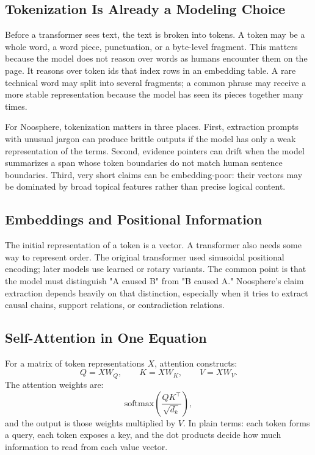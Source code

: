 \documentclass[11pt]{article}
\begin{document}
\subsection{Tokenization Is Already a Modeling Choice}

Before a transformer sees text, the text is broken into tokens. A token may be a
whole word, a word piece, punctuation, or a byte-level fragment. This matters
because the model does not reason over words as humans encounter them on the
page. It reasons over token ids that index rows in an embedding table. A rare
technical word may split into several fragments; a common phrase may receive a
more stable representation because the model has seen its pieces together many
times.

For Noosphere, tokenization matters in three places. First, extraction prompts
with unusual jargon can produce brittle outputs if the model has only a weak
representation of the terms. Second, evidence pointers can drift when the model
summarizes a span whose token boundaries do not match human sentence
boundaries. Third, very short claims can be embedding-poor: their vectors may be
dominated by broad topical features rather than precise logical content.

\subsection{Embeddings and Positional Information}

The initial representation of a token is a vector. A transformer also needs some
way to represent order. The original transformer used sinusoidal positional
encoding; later models use learned or rotary variants. The common point is that
the model must distinguish "A caused B" from "B caused A." Noosphere's claim
extraction depends heavily on that distinction, especially when it tries to
extract causal chains, support relations, or contradiction relations.

\subsection{Self-Attention in One Equation}

For a matrix of token representations $X$, attention constructs:
\[
Q = XW_Q,\qquad K = XW_K,\qquad V = XW_V.
\]
The attention weights are:
\[
\mathrm{softmax}\left(\frac{QK^\top}{\sqrt{d_k}}\right),
\]
and the output is those weights multiplied by $V$. In plain terms: each token
forms a query, each token exposes a key, and the dot products decide how much
information to read from each value vector.
\end{document}

